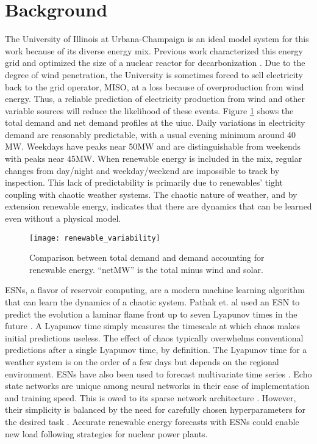 \section{Background}


The University of Illinois at Urbana-Champaign is an ideal model system for
this work because of its diverse energy mix. Previous work
characterized this energy grid and optimized the size of a nuclear reactor
for decarbonization \cite{dotson_optimal_2020}. Due to the degree of wind
penetration, the University is sometimes
forced to sell electricity back to the grid operator, MISO, at a loss because
of overproduction
from wind energy. Thus, a reliable prediction of electricity production from
wind and other variable sources will reduce the likelihood of these events.
Figure \ref{figure:vre} shows the total demand and net demand profiles at the
\gls{uiuc}.
Daily variations in electricity demand are reasonably predictable, with a
usual evening minimum around 40 MW. Weekdays have peaks near 50MW and are
distinguishable from weekends with peaks near 45MW. When renewable energy is
included in the mix, regular changes from day/night and weekday/weekend are
impossible to track by inspection. This lack of predictability is primarily due
to renewables' tight coupling with chaotic weather systems. The chaotic nature
of weather, and by extension renewable energy, indicates that there are
dynamics that can be learned even without a physical model.
\begin{figure}[h]
  \centering
  \texttt{[image: renewable\_variability]}
  \caption{Comparison between total demand and demand accounting for renewable
   energy. ``netMW'' is the total minus wind and solar.}
  \label{figure:vre}
\end{figure}

\glspl{ESN}, a flavor of reservoir computing, are a modern
machine learning algorithm that can learn the dynamics of a chaotic system.
Pathak et. al used an \gls{ESN} to predict the
evolution a laminar flame front up to seven Lyapunov
times in the future \cite{pathak_model-free_2018, wikner_combining_2020}. A
Lyapunov time simply measures the timescale at which chaos makes initial
predictions useless. The effect of chaos typically overwhelms conventional
predictions after a single Lyapunov time, by definition.
The Lyapunov time for a weather system is on the order of a few days but
depends on the regional environment. \glspl{ESN} have also been used to
forecast multivariate time series \cite{bianchi_reservoir_2020}. Echo state
networks are unique among neural
networks in their ease of implementation and training speed. This is owed to its
sparse network architecture \cite{pathak_model-free_2018,
wikner_combining_2020, vannitsem_predictability_2017}. However,
their simplicity is balanced by the need for carefully chosen hyperparameters
for the desired task \cite{lukosevicius_practical_2012}.
Accurate renewable energy forecasts with \glspl{ESN} could enable new load
following strategies for nuclear power plants.
